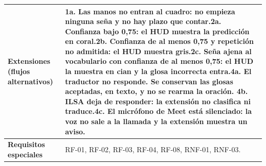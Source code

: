 \begin{table}[h!]
\begin{tabularx}{\textwidth}{|>{\raggedright\arraybackslash\bfseries}p{4cm}|p{0.5cm}|X|X|}
Extensiones (flujos alternativos) & \multicolumn{3}{p{\dimexpr\textwidth-4.5cm-4\tabcolsep\relax}|}{\textbf{1a.} Las manos no entran al cuadro: no empieza ninguna seña y no hay plazo que contar.\newline\textbf{2a.} Confianza bajo 0,75: el HUD muestra la predicción en coral.\newline\textbf{2b.} Confianza de al menos 0,75 y repetición no admitida: el HUD muestra gris.\newline\textbf{2c.} Seña ajena al vocabulario con confianza de al menos 0,75: el HUD la muestra en cian y la glosa incorrecta entra.\newline\textbf{4a.} El traductor no responde. Se conservan las glosas aceptadas, en texto, y no se rearma la oración. \newline\textbf{4b.} ILSA deja de responder: la extensión no clasifica ni traduce.\newline\textbf{4c.} El micrófono de Meet está silenciado: la voz no sale a la llamada y la extensión muestra un aviso.} \\ \hline
Requisitos especiales & \multicolumn{3}{p{\dimexpr\textwidth-4.5cm-4\tabcolsep\relax}|}{RF-01, RF-02, RF-03, RF-04, RF-08, RNF-01, RNF-03.} \\ \hline
\end{tabularx}
\end{table}


